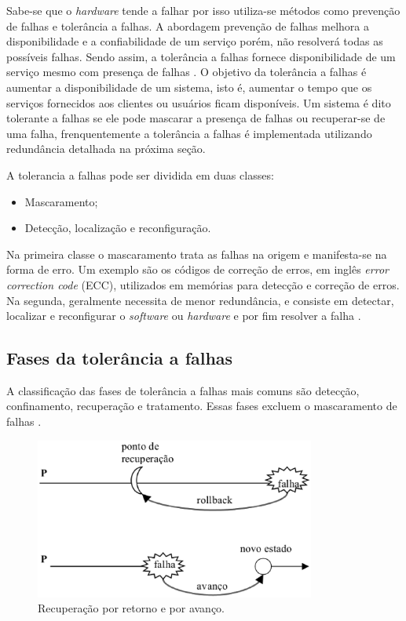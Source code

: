 Sabe-se que o \textit{hardware} tende a falhar por isso utiliza-se métodos como prevenção de falhas e tolerância a falhas.
A abordagem prevenção de falhas melhora a disponibilidade e a confiabilidade de um serviço porém, não resolverá todas as possíveis falhas.
Sendo assim, a tolerância a falhas fornece disponibilidade de um serviço mesmo com presença de falhas \cite{pankaj1994}.
O objetivo da tolerância a falhas é aumentar a disponibilidade de um sistema, isto é, aumentar o tempo que os serviços fornecidos aos 
clientes ou usuários ficam disponíveis. Um sistema é dito tolerante a falhas se ele pode mascarar a presença de falhas 
ou recuperar-se de uma falha, frenquentemente a tolerância a falhas é implementada utilizando redundância detalhada na próxima seção.

A tolerancia a falhas pode ser dividida em duas classes:
\begin{itemize}
 \item Mascaramento;
 \item Detecção, localização e reconfiguração.
\end{itemize}

Na primeira classe o mascaramento trata as falhas na origem e manifesta-se na forma de erro. Um exemplo são os 
códigos de correção de erros, em inglês \textit{error correction code} (ECC), utilizados em memórias para detecção e correção de erros.
Na segunda, geralmente necessita de menor redundância, e consiste em detectar, localizar e reconfigurar o \textit{software} ou
\textit{hardware} e por fim resolver a falha \cite{weber2002}.

\subsection{Fases da tolerância a falhas}

A classificação das fases de tolerância a falhas mais comuns são detecção, confinamento, recuperação e tratamento. Essas fases excluem
o mascaramento de falhas \cite{weber2002}.

\begin{figure}[falhasrecup]
 \centering
 \includegraphics[height=200px]{img/recuperacao_ret_ava.eps}
 \caption{Recuperação por retorno e por avanço.}
 \label{fig:recuperacao_ret_ava}
\end{figure}


